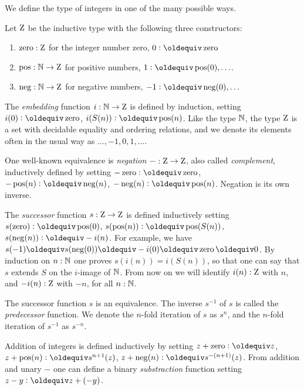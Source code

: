 \documentclass[a4,12pt]{amsart}
\begin{document}
We define the type of integers in one of the many possible ways.

\begin{definition}\label{def:integers}
Let $\mathrm{Z}$ be the inductive type with the following three constructors:
\begin{enumerate}[topsep=0pt]
\item $\mathop{\mathrm{zero}}: \mathrm{Z}$ for the integer number zero, 
$0 \defeq \zzero$
\item $\mathop{\mathrm{pos}}: \mathbb{N} \to \mathrm{Z}$ for positive numbers,
$1 \defeq \zpos(0),\ldots$.
\item $\mathop{\mathrm{neg}}: \mathbb{N} \to \mathrm{Z}$ for negative numbers, 
$-1 \defeq \zneg(0),\ldots$
\end{enumerate}
\end{definition}

The \emph{embedding} function $i:\mathbb{N}\to\mathrm{Z}$ is defined by induction,
setting $i(0)\defeq \zzero$, $i(S(n))\defeq \zpos(n)$.
Like the type $\mathbb{N}$, the type $\mathrm{Z}$ is a set with decidable equality
and ordering relations,
and we denote its elements often in the usual way as $\ldots,-1,0,1,\ldots$.

One well-known equivalence is \emph{negation} ${-}:\mathrm{Z}\to\mathrm{Z}$, 
also called \emph{complement}, inductively defined by setting 
$-\zzero\defeq \zzero$, 
$-\zpos(n)\defeq \zneg(n)$, 
$-\zneg(n)\defeq \zpos(n)$.
Negation is its own inverse.

The \emph{successor} function $s:\mathrm{Z}\to\mathrm{Z}$ is defined inductively setting 
$s(\zzero)\defeq \zpos(0)$, 
$s(\zpos(n))\defeq \zpos(S(n))$,
$s(\zneg(n))\defeq -i(n)$. For example, we have
$s(-1)\jdeq s(\zneg(0))\jdeq -i(0) \jdeq \zzero \jdeq 0$.
By induction on $n:\mathbb{N}$ one proves $s(i(n))=i(S(n))$, 
so that one can say that $s$ extends $S$ on the $i$-image of $\mathbb{N}$. 
From now on we will identify $i(n):\mathrm{Z}$ with $n$,
and $-i(n):\mathrm{Z}$ with $-n$, for all $n:\mathbb{N}$.

The successor function $s$ is an equivalence.
The inverse $s^{-1}$ of $s$ is called the \emph{predecessor} function.
We denote the $n$-fold iteration of $s$ as $s^n$, and
the $n$-fold iteration of $s^{-1}$ as $s^{-n}$.

Addition of integers is defined inductively by setting
$z + \zzero\defeq z$, 
$z + \zpos(n)\defeq s^{n+1}(z)$, 
$z + \zneg(n)\defeq s^{-(n+1)}(z)$.
From addition and unary $-$ one can define a binary
\emph{substraction} function setting $z-y \defeq z+(-y)$.
\end{document}
